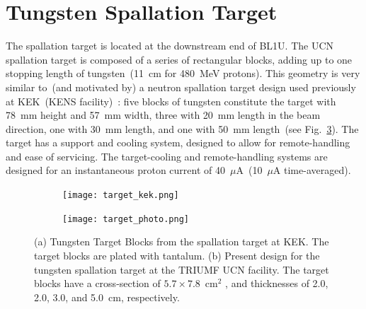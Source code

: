 \section{Tungsten Spallation Target\label{sec:target}}
The spallation target is located at the downstream end of BL1U. The
UCN spallation target is composed of a series of rectangular blocks,
adding up to one stopping length of tungsten~(11~cm for 480~MeV
protons). This geometry is very similar to~(and motivated by) a
neutron spallation target design used previously at KEK~(KENS
facility)~\cite{kawai2001fabrication}: five blocks of tungsten
constitute the target with 78~mm height and 57~mm width, three with
20~mm length in the beam direction, one with 30~mm length, and one
with 50~mm length~(see Fig.~\ref{fig:target}).  The target has a
support and cooling system, designed to allow for remote-handling and
ease of servicing. The target-cooling and remote-handling systems are
designed for an instantaneous proton current of 40~$\mu$A~(10~$\mu$A
time-averaged).

\begin{figure}[h!]
  \centering
  \begin{subfigure}{.5\textwidth}
    \centering
    \texttt{[image: target\_kek.png]}
    \caption{}
    \label{fig:target_kek}
  \end{subfigure}%
  \begin{subfigure}{.5\textwidth}
    \centering
    \texttt{[image: target\_photo.png]}
    \caption{}
    \label{fig:target_photo}
  \end{subfigure}
  \caption[TUCAN's spallation target]{(a) Tungsten Target Blocks from
    the spallation target at KEK. The target blocks are plated with
    tantalum. (b) Present design for the tungsten spallation target at
    the TRIUMF UCN facility. The target blocks have a cross-section of
    $5.7 \times 7.8$~cm$^2$ , and thicknesses of 2.0, 2.0, 3.0, and
    5.0~cm, respectively.}
  \label{fig:target}
\end{figure}

